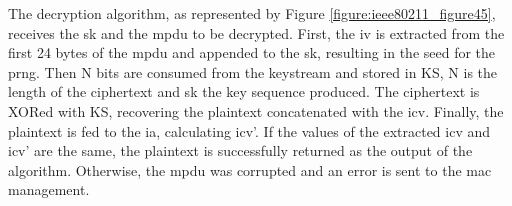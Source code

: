 The decryption algorithm, as represented by Figure \ref{figure:ieee80211_figure45}, receives the \gls{sk} and the \gls{mpdu} to be decrypted. First, the \gls{iv} is extracted from the first 24 bytes of the \gls{mpdu} and appended to the \gls{sk}, resulting in the seed for the \gls{prng}. Then \gls{N} bits are consumed from the keystream and stored in \gls{KS}, \gls{N} is the length of the ciphertext and \gls{sk} the key sequence produced. The ciphertext is XORed with \gls{KS}, recovering the plaintext concatenated with the \gls{icv}. Finally, the plaintext is fed to the \gls{ia}, calculating \gls{icv}’. If the values of the extracted \gls{icv} and \gls{icv}’ are the same, the plaintext is successfully returned as the output of the algorithm. Otherwise, the \gls{mpdu} was corrupted and an error is sent to the \gls{mac} management.

\FloatBarrier
